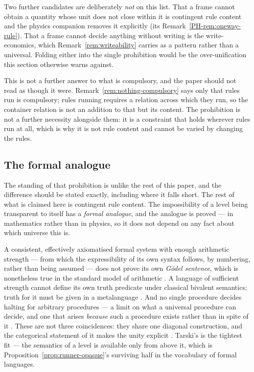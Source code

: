 \documentclass[11pt,a4paper]{article}
\theoremstyle{remark}\newtheorem{remark}[definition]{Remark}
\begin{document}
Two further candidates are deliberately \emph{not} on this list. That a frame cannot obtain a quantity whose unit
does not close within it is contingent rule content and the physics companion removes it explicitly
(its Remark~\ref{PH-rem:oneway-rule}).
That a frame cannot decide anything without writing is the write-economics, which
Remark~\ref{rem:writeability} carries as a pattern rather than a universal. Folding either into the
single prohibition would be the over-unification this section otherwise warns against.

This is not a further answer to what is compulsory, and the paper should not read as though it were.
Remark~\ref{rem:nothing-compulsory} says only that rules run is compulsory; rules running requires a
relation across which they run, so the container relation is not an addition to that but its content.
The prohibition is not a further necessity alongside them: it is a constraint that holds wherever
rules run at all, which is why it is not rule content and cannot be varied by changing the rules.

\subsection*{The formal analogue}\label{sec:formal-analogue}

The standing of that prohibition is unlike the rest of this paper, and the difference should be stated
exactly, including where it falls short. The rest of what is claimed
here is contingent rule content. The impossibility of a level being transparent to itself has a
\emph{formal analogue}, and the analogue is proved --- in mathematics rather than in physics, so it
does not depend on any fact about which universe this is.

A consistent, effectively axiomatised formal system with enough arithmetic strength --- from which
the expressibility of its own syntax follows, by numbering, rather than being assumed --- does not
prove its own \emph{Gödel sentence}, which is nonetheless true in the standard model of arithmetic
\citep{godel1931}. A language of sufficient strength cannot define its own truth predicate under
classical bivalent semantics; truth for it must be given in a metalanguage \citep{tarski1936}. And no single procedure decides halting for arbitrary procedures --- a limit on what a universal
procedure can decide, and one that arises \emph{because} such a procedure exists rather than in spite
of it \citep{turing1936}. These are not three coincidences: they share one diagonal construction, and the
categorical statement of it makes the unity explicit \citep{lawvere1969,yanofsky2003}. Tarski's is the
tightest fit --- the semantics of a level is available only from above it, which is
Proposition~\ref{prop:runner-opaque}'s surviving half in the vocabulary of formal languages.
\end{document}
